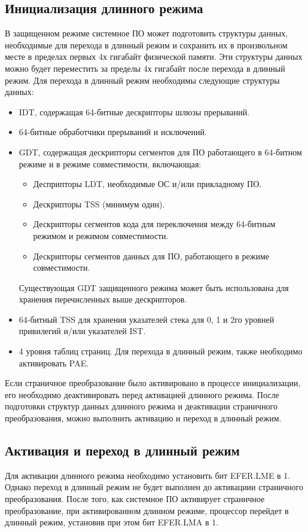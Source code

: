 \subsection{Инициализация длинного режима}
В защищенном режиме системное ПО может подготовить структуры данных, необходимые для перехода в
длинный режим и сохранить их в произвольном месте в пределах первых 4х гигабайт физической памяти.
Эти структуры данных можно будет переместить за пределы 4х гигабайт после перехода в длинный режим.
Для перехода в длинный режим необходимы следующие структуры данных:
\begin{itemize}
\item IDT, содержащая 64-битные дескрипторы шлюзы прерываний.
\item 64-битные обработчики прерываний и исключений.
\item GDT, содержащая дескрипторы сегментов для ПО работающего в 64-битном режиме и в
	режиме совместимости, включающая:
	\begin{itemize}
	\item Десприпторы LDT, необходимые ОС и/или прикладному ПО.
	\item Дескрипторы TSS (минимум один).
	\item Дескрипторы сегментов кода для переключения между 64-битным режимом и режимом совместимости.
	\item Дескрипторы сегментов данных для ПО, работающего в режиме совместимости.
	\end{itemize}

	Существующая GDT защищенного режима может быть использована для хранения перечисленных
	выше дескрипторов.
\item 64-битный TSS для хранения указателей стека для 0, 1 и 2го уровней привилегий и/или указателей IST.
\item 4 уровня таблиц страниц. Для перехода в длинный режим, также необходимо активировать PAE.
\end{itemize}

Если страничное преобразование было активировано в процессе инициализации, его необходимо деактивировать перед
активацией длинного режима. После подготовки структур данных длинного режима и деактивации страничного преобразования,
можно выполнить активацию и переход в длинный режим.

\subsection{Активация и переход в длинный режим}
Для активации длинного режима необходимо установить бит EFER.LME в 1. Однако переход в длинный режим
не будет выполнен до активациии страничного преобразования. После того, как системное ПО
активирует страничное преобразование, при активированном длинном режиме, процессор перейдет в
длинный режим, установив при этом бит EFER.LMA в 1.

